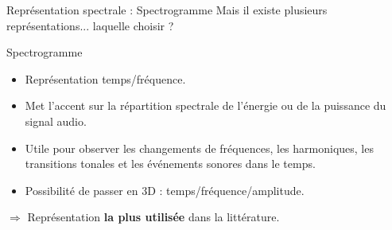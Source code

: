 \documentclass[compress,xcolor=table]{beamer}
\begin{document}
\begin{frame}{Représentation spectrale : Spectrogramme}
    Mais il existe plusieurs représentations... laquelle choisir ?

    \begin{block}{Spectrogramme}

        \begin{itemize}
            \item Représentation temps/fréquence.
            \item Met l'accent sur la répartition spectrale de l'énergie ou de la puissance du signal audio.
            \item Utile pour observer les changements de fréquences, les harmoniques, les transitions tonales et les événements sonores dans le temps.
            \item Possibilité de passer en 3D : temps/fréquence/amplitude.
        \end{itemize}

    \end{block}

    $\Rightarrow$ Représentation \textbf{la plus utilisée} dans la littérature.

\end{frame}
\end{document}
